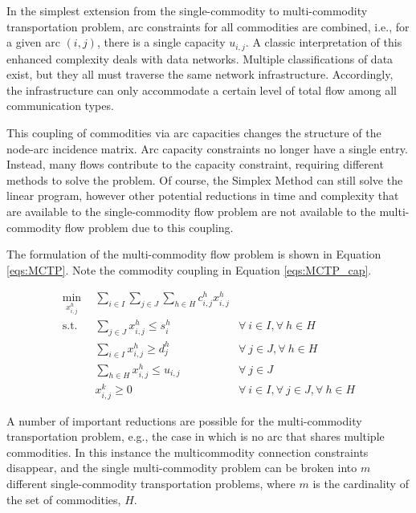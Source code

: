 In the simplest extension from the single-commodity to multi-commodity
transportation problem, arc constraints for all commodities are combined, i.e.,
for a given arc $(i, j)$, there is a single capacity $u_{i,j}$. A classic
interpretation of this enhanced complexity deals with data networks. Multiple
classifications of data exist, but they all must traverse the same network
infrastructure. Accordingly, the infrastructure can only accommodate a certain
level of total flow among all communication types.

This coupling of commodities via arc capacities changes the structure of the
node-arc incidence matrix. Arc capacity constraints no longer have a single
entry. Instead, many flows contribute to the capacity constraint, requiring
different methods to solve the problem. Of course, the Simplex Method can still
solve the linear program, however other potential reductions in time and
complexity that are available to the single-commodity flow problem are not
available to the multi-commodity flow problem due to this coupling.

The formulation of the multi-commodity flow problem is shown in Equation
\ref{eqs:MCTP}. Note the commodity coupling in Equation \ref{eqs:MCTP_cap}.

\begin{subequations}\label{eqs:MCTP}
  \begin{align}
    \min_{x_{i,j}^{h}} \:\: & 
    \sum_{i \in I}\sum_{j \in J}\sum_{h \in H} c_{i,j}^{h} x_{i,j}^{h}
    & \label{eqs:MCTP_obj} \\
    \text{s.t.} \:\: &
    \sum_{j \in J} x_{i,j}^{h} \leq s_{i}^{h}
    &
    \forall \: i \in I, \forall \: h \in H \label{eqs:MCTP_sup} \\
    &
    \sum_{i \in I} x_{i,j}^{h} \geq d_{j}^{h}
    & 
    \forall \: j \in J, \forall \: h \in H \label{eqs:MCTP_dem} \\
    &
    \sum_{h \in H} x_{i,j}^{h} \leq u_{i,j}
    & 
    \forall \: j \in J \label{eqs:MCTP_cap} \\
    &
    x_{i,j}^{k} \geq 0
    &
    \forall \: i \in I, \forall \: j \in J, \forall \: h \in H \label{eqs:MCTP_x}
  \end{align}
\end{subequations}

A number of important reductions are possible for the multi-commodity
transportation problem, e.g., the case in which is no arc that shares multiple
commodities. In this instance the multicommodity connection constraints
disappear, and the single multi-commodity problem can be broken into $m$
different single-commodity transportation problems, where $m$ is the cardinality
of the set of commodities, $H$. 
